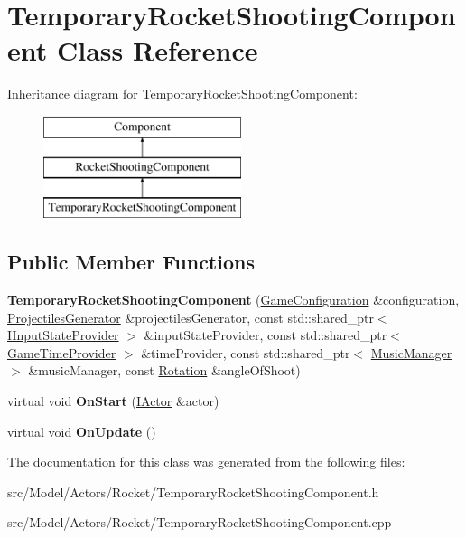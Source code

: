 \hypertarget{classTemporaryRocketShootingComponent}{}\section{Temporary\+Rocket\+Shooting\+Component Class Reference}
\label{classTemporaryRocketShootingComponent}
Inheritance diagram for Temporary\+Rocket\+Shooting\+Component\+:\begin{figure}[H]
\begin{center}
\leavevmode
\includegraphics[height=3.000000cm]{classTemporaryRocketShootingComponent}
\end{center}
\end{figure}
\subsection*{Public Member Functions}
\begin{DoxyCompactItemize}
\item 
{\bfseries Temporary\+Rocket\+Shooting\+Component} (\hyperlink{classGameConfiguration}{Game\+Configuration} \&configuration, \hyperlink{classProjectilesGenerator}{Projectiles\+Generator} \&projectiles\+Generator, const std\+::shared\+\_\+ptr$<$ \hyperlink{classIInputStateProvider}{I\+Input\+State\+Provider} $>$ \&input\+State\+Provider, const std\+::shared\+\_\+ptr$<$ \hyperlink{classGameTimeProvider}{Game\+Time\+Provider} $>$ \&time\+Provider, const std\+::shared\+\_\+ptr$<$ \hyperlink{classMusicManager}{Music\+Manager} $>$ \&music\+Manager, const \hyperlink{classRotation}{Rotation} \&angle\+Of\+Shoot)\hypertarget{classTemporaryRocketShootingComponent_a37cc9b8e79c3384414dc0ae85a66de3c}{}\label{classTemporaryRocketShootingComponent_a37cc9b8e79c3384414dc0ae85a66de3c}

\item 
virtual void {\bfseries On\+Start} (\hyperlink{classIActor}{I\+Actor} \&actor)\hypertarget{classTemporaryRocketShootingComponent_a07d913b3bd8d7b3a7a705bdcacc0c07d}{}\label{classTemporaryRocketShootingComponent_a07d913b3bd8d7b3a7a705bdcacc0c07d}

\item 
virtual void {\bfseries On\+Update} ()\hypertarget{classTemporaryRocketShootingComponent_af613ff0a708f856d037a7d252526adb9}{}\label{classTemporaryRocketShootingComponent_af613ff0a708f856d037a7d252526adb9}

\end{DoxyCompactItemize}


The documentation for this class was generated from the following files\+:\begin{DoxyCompactItemize}
\item 
src/\+Model/\+Actors/\+Rocket/Temporary\+Rocket\+Shooting\+Component.\+h\item 
src/\+Model/\+Actors/\+Rocket/Temporary\+Rocket\+Shooting\+Component.\+cpp\end{DoxyCompactItemize}
